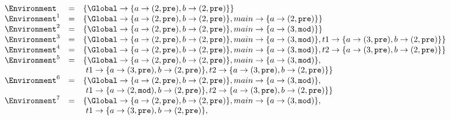 \begin{figure}
	\centering
	$$\begin{array}{l l l}
		\Environment		&=& \left \lbrace
									\Global \to \lbrace a \to (2, \mathtt{pre}), b \to (2, \mathtt{pre}) \rbrace
								\right \rbrace	\\
		\Environment^1		&=& \left \lbrace
									\Global \to \lbrace a \to (2, \mathtt{pre}), b \to (2, \mathtt{pre}) \rbrace, 
									main \to \lbrace a \to (2, \mathtt{pre}) \rbrace
								\right \rbrace	\\
		\Environment^2		&=& \left \lbrace
									\Global \to \lbrace a \to (2, \mathtt{pre}), b \to (2, \mathtt{pre}) \rbrace, 
									main \to \lbrace a \to (3, \mathtt{mod}) \rbrace
								\right \rbrace	\\
		\Environment^3		&=& \left \lbrace
									\Global \to \lbrace a \to (2, \mathtt{pre}), b \to (2, \mathtt{pre}) \rbrace, 
									main \to \lbrace a \to (3, \mathtt{mod}) \rbrace,
									t1 \to \lbrace a \to (3, \mathtt{pre}), b \to (2, \mathtt{pre}) \rbrace
								\right \rbrace	\\
		\Environment^4		&=& \left \lbrace
									\Global \to \lbrace a \to (2, \mathtt{pre}), b \to (2, \mathtt{pre}) \rbrace, 
									main \to \lbrace a \to (3, \mathtt{mod}) \rbrace,
									t2 \to \lbrace a \to (3, \mathtt{pre}), b \to (2, \mathtt{pre}) \rbrace
								\right \rbrace	\\
		\Environment^5		&=& \lbrace
									\Global \to \lbrace a \to (2, \mathtt{pre}), b \to (2, \mathtt{pre}) \rbrace, 
									main \to \lbrace a \to (3, \mathtt{mod}) \rbrace,	\\
							& &	  ~ t1 \to \lbrace a \to (3, \mathtt{pre}), b \to (2, \mathtt{pre}) \rbrace,
									t2 \to \lbrace a \to (3, \mathtt{pre}), b \to (2, \mathtt{pre}) \rbrace
								\rbrace	\\
		\Environment^6		&=& \lbrace
									\Global \to \lbrace a \to (2, \mathtt{pre}), b \to (2, \mathtt{pre}) \rbrace, 
									main \to \lbrace a \to (3, \mathtt{mod}) \rbrace,	\\
							& &	  ~ t1 \to \lbrace a \to (2, \mathtt{mod}), b \to (2, \mathtt{pre}) \rbrace,
									t2 \to \lbrace a \to (3, \mathtt{pre}), b \to (2, \mathtt{pre}) \rbrace
								\rbrace	\\
		\Environment^7		&=& \lbrace
									\Global \to \lbrace a \to (2, \mathtt{pre}), b \to (2, \mathtt{pre}) \rbrace, 
									main \to \lbrace a \to (3, \mathtt{mod}) \rbrace,	\\
							& &	  ~ t1 \to \lbrace a \to (3, \mathtt{pre}), b \to (2, \mathtt{pre}) \rbrace,

\end{array}$$
\end{figure}
